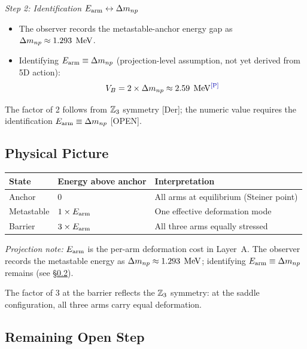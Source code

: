 \begin{derivationbox}[title=Conjecture: $\VB = 2 \times \Delta m_{np}$]
    \emph{Step 2: Identification $E_{\text{arm}} \leftrightarrow \Delta m_{np}$} \tagOPEN
    \begin{itemize}
        \item The observer records the metastable-anchor energy gap as
              $\Delta m_{np} \approx 1.293\;\,\mathrm{MeV}$.
        \item Identifying $E_{\text{arm}} \equiv \Delta m_{np}$ (projection-level
              assumption, not yet derived from 5D action):
              \begin{equation}
                  \VB = 2 \times \Delta m_{np} \approx 2.59\;\MeV \tagP
              \end{equation}
    \end{itemize}

    The factor of 2 follows from $\mathbb{Z}_3$ symmetry [Der]; the numeric
    value requires the identification $E_{\text{arm}} \equiv \Delta m_{np}$ [OPEN].
\end{derivationbox}

\subsection{Physical Picture}

\begin{center}
\begin{tabular}{lll}
\toprule
State & Energy above anchor & Interpretation \\
\midrule
Anchor & $0$ & All arms at equilibrium (Steiner point) \\
Metastable & $1 \times E_{\text{arm}}$ & One effective deformation mode \\
Barrier & $3 \times E_{\text{arm}}$ & All three arms equally stressed \\
\bottomrule
\end{tabular}
\end{center}

\noindent
\emph{Projection note:} $E_{\text{arm}}$ is the per-arm deformation cost in Layer~A.
The observer records the metastable energy as $\Delta m_{np} \approx 1.293\;\,\mathrm{MeV}$;
identifying $E_{\text{arm}} \equiv \Delta m_{np}$ remains \tagOPEN{} (see \S\ref{sec:metastable:open_unit}).

The factor of 3 at the barrier reflects the $\mathbb{Z}_3$ symmetry: at the saddle
configuration, all three arms carry equal deformation.

\subsection{Remaining Open Step}
\label{sec:metastable:open_unit}

